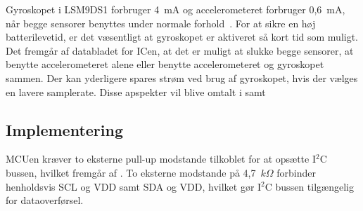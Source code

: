 Gyroskopet i LSM9DS1 forbruger 4~mA og accelerometeret forbruger 0,6~mA, når begge sensorer benyttes under normale forhold~\citep{Jimb02016}. For at sikre en høj batterilevetid, er det væsentligt at gyroskopet er aktiveret så kort tid som muligt. Det fremgår af databladet for ICen, at det er muligt at slukke begge sensorer, at benytte accelerometeret alene eller benytte accelerometeret og gyroskopet sammen. Der kan yderligere spares strøm ved brug af gyroskopet, hvis der vælges en lavere samplerate. Disse apspekter vil blive omtalt i  samt \\ %
 
\subsection{Implementering}
MCUen kræver to eksterne pull-up modstande tilkoblet for at opsætte I$^{2}$C bussen, hvilket fremgår af . To eksterne modstande på 4,7~$k\Omega$ forbinder henholdsvis SCL og VDD samt SDA og VDD, hvilket gør I$^{2}$C bussen tilgængelig for dataoverførsel.

